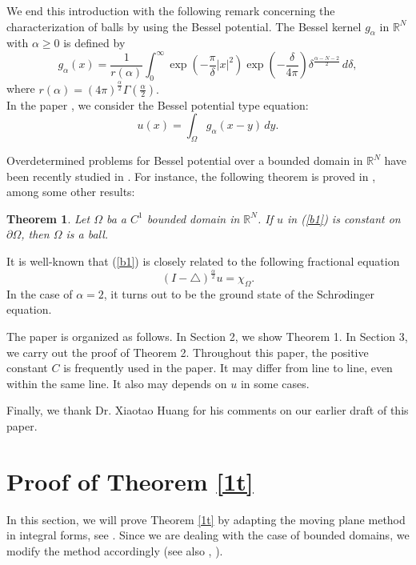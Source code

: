 \documentclass[12pt]{amsproc}
\theoremstyle{plain}
\numberwithin{equation}{section}
\newtheorem{mthm}{Theorem}
\begin{document}
We end this introduction with the following remark concerning the
characterization of balls by using the Bessel potential. The Bessel
kernel $g_\alpha$ in $\mathbb R^N$ with $\alpha\geq 0$ is defined by
\begin{equation}
g_\alpha(x)=\frac{1}{r(\alpha)}\int_0^{\infty}
\exp(-\frac{\pi}{\delta}|x|^2)\exp(-\frac{\delta}{4\pi})\delta^{\frac{\alpha-N-2}{2}}
\,d\delta, \label{ex1}
\end{equation}
where $r(\alpha)=(4\pi)^{\frac{\alpha}{2}}\Gamma(\frac{\alpha}{2}).$\\

In  the paper \cite{HLZ}, we consider the Bessel potential type
equation:
\begin{equation}
u(x)=\int_\Omega g_\alpha(x-y) \,dy. \label{b1}
\end{equation}

Overdetermined problems for Bessel potential over a bounded domain in $\mathbb R^N$ have
been recently studied in \cite{HLZ}. For instance,
 the following theorem is proved in \cite{HLZ}, among some other results:
\begin{mthm}
Let $\Omega$ ba a $C^1$ bounded domain in $\mathbb R^N$. If $u$ in
(\ref{b1}) is constant on $\partial\Omega$, then $\Omega$ is a ball.
\label{4t}
\end{mthm}

It is well-known that (\ref{b1}) is closely related to the following
fractional equation
$$(I-{\mbox{$\bigtriangleup$}})^{\frac{\alpha}{2}}u=\chi_\Omega.$$
In the case of $\alpha=2$, it turns out to be the ground state of
the Schr$\ddot{o}$dinger equation.

The paper is organized as follows. In Section 2, we show Theorem 1.
In Section 3, we carry out the proof of Theorem 2.  Throughout this
paper, the positive constant $C$ is frequently used in the paper. It
may differ from line to line,  even within the same line. It also
may depends on $u$ in some cases. 

Finally, we thank Dr. Xiaotao Huang for his comments on our earlier draft of this paper.

\section{Proof of Theorem \ref{1t}}

In this section, we will prove Theorem \ref{1t} by adapting the
moving plane method in integral forms, see \cite{CLO}. Since we are
dealing with the case of bounded domains, we modify the method
accordingly (see also \cite{LSW}, \cite{CZ}).
\end{document}
